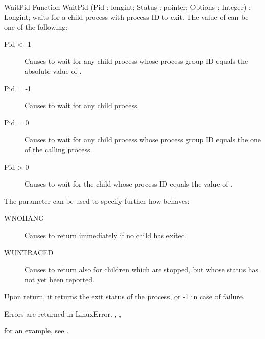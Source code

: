 
\begin{function}{WaitPid}
\Declaration
Function WaitPid (Pid : longint; Status : pointer; Options : Integer) : Longint;
\Description
  waits for a child process with process ID  to exit. The
value of  can be one of the following:
\begin{description}
\item[Pid < -1] Causes  to wait for  any  child  process  whose
              process group ID equals the absolute value of .
\item[Pid = -1] Causes  to wait for any child process.
\item[Pid = 0] Causes  to wait for  any  child  process  whose
              process  group  ID  equals the one of the calling
              process.
\item[Pid > 0] Causes  to wait for the child whose process  ID
equals the value of .
\end{description}
The  parameter can be used to specify further how 
behaves:
\begin{description}
\item [WNOHANG] Causes  to return immediately if no child  has
exited.
\item [WUNTRACED] Causes  to return also for children which are
stopped, but whose status has not yet been reported.
\end{description} 
Upon return, it returns the exit status of the process, or -1 in case of
failure. 

\Errors
Errors are returned in LinuxError.
\SeeAlso
{}, , 
\end{function}
for an example, see .


